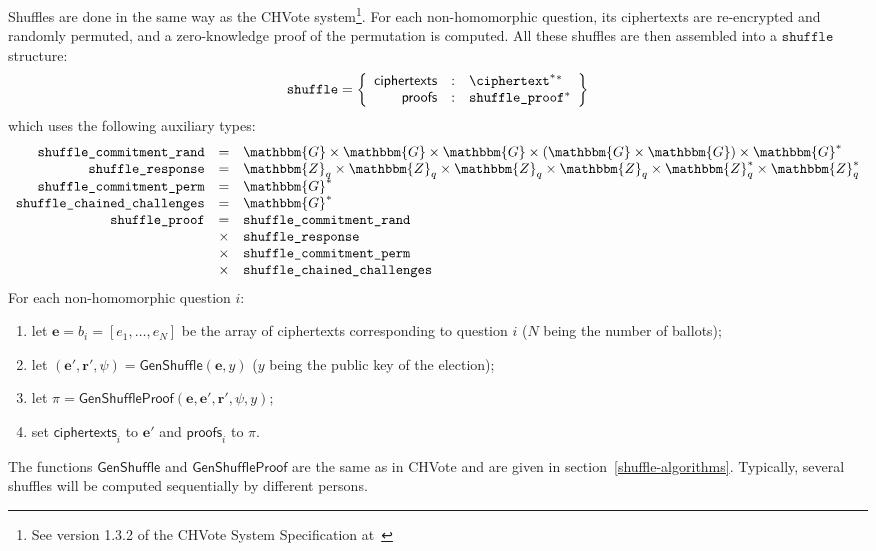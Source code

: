 \documentclass[a4paper]{article}
\newcommand{\G}{\mathbbm{G}}
\newcommand{\Z}{\mathbbm{Z}}
\begin{document}
Shuffles are done in the same way as the CHVote system\footnote{See
  version 1.3.2 of the CHVote System Specification at~\cite{CHVote}}.
For each non-homomorphic
question, its ciphertexts are re-encrypted and randomly
permuted, and a zero-knowledge proof of the permutation is
computed. All these shuffles are then assembled into a
$\texttt{shuffle}$ structure:
\begin{gather*}
  \texttt{shuffle}=\left\{
    \begin{array}{rcl}
      \textsf{ciphertexts}&:&\ciphertext^\ast{}^\ast\\
      \textsf{proofs}&:&\texttt{shuffle\_proof}^\ast
    \end{array}
  \right\}
\end{gather*}
which uses the following auxiliary types:
\begin{gather*}
  \begin{array}{rcl}
    \texttt{shuffle\_commitment\_rand}&=&\G\times\G\times\G\times(\G\times\G)\times\G^\ast\\
    \texttt{shuffle\_response}&=&\Z_q\times\Z_q\times\Z_q\times\Z_q\times\Z_q^\ast\times\Z_q^\ast\\
    \texttt{shuffle\_commitment\_perm}&=&\G^\ast\\
    \texttt{shuffle\_chained\_challenges}&=&\G^\ast\\
    \texttt{shuffle\_proof}&=&\texttt{shuffle\_commitment\_rand}\\
                                      &\times&\texttt{shuffle\_response}\\
                                      &\times&\texttt{shuffle\_commitment\_perm}\\
                                      &\times&\texttt{shuffle\_chained\_challenges}
  \end{array}
\end{gather*}
For each non-homomorphic question $i$:
\begin{enumerate}
\item let $\textbf{e}=b_i=[e_1,\dots,e_N]$ be the array of ciphertexts
  corresponding to question $i$ ($N$ being the number of ballots);
\item let
  $(\textbf{e}',\textbf{r}',\psi)=\textsf{GenShuffle}(\textbf{e},y)$
  ($y$ being the public key of the election);
\item let
  $\pi=\textsf{GenShuffleProof}(\textbf{e},\textbf{e}',\textbf{r}',\psi,y)$;
  \item set $\textsf{ciphertexts}_i$ to $\textbf{e}'$ and
    $\textsf{proofs}_i$ to $\pi$.
\end{enumerate}
The functions $\textsf{GenShuffle}$ and $\textsf{GenShuffleProof}$ are
the same as in CHVote and are given in
section~\ref{shuffle-algorithms}. Typically, several shuffles will be
computed sequentially by different persons.
\end{document}
